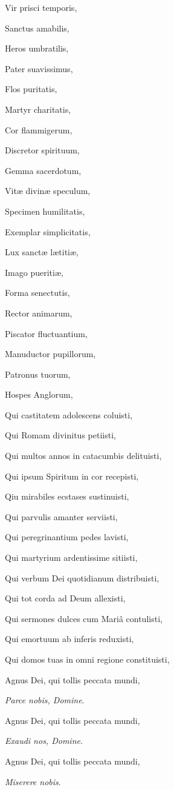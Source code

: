 Vir prisci temporis,

Sanctus amabilis,

Heros umbratilis,

Pater suavissimus,

Flos puritatis,

Martyr charitatis,

Cor flammigerum, 

Discretor spirituum,

Gemma sacerdotum,

Vitæ divinæ speculum,

Specimen humilitatis,

Exemplar simplicitatis,

Lux sanctæ lætitiæ,

Imago pueritiæ,

Forma senectutis,

Rector animarum,

Piscator fluctuantium,

Manuductor pupillorum,

Patronus tuorum,

Hospes Anglorum,

Qui castitatem adolescens coluisti,

Qui Romam divinitus petiisti,

Qui multos annos in catacumbis delituisti,

Qui ipsum Spiritum in cor recepisti,

Qiu mirabiles ecstases sustinuisti,

Qui parvulis amanter serviisti,

Qui peregrinantium pedes lavisti,

Qui martyrium ardentissime sitiisti,

Qui verbum Dei quotidianum distribuisti,

Qui tot corda ad Deum allexisti,

Qui sermones dulces cum Mariâ contulisti,

Qui emortuum ab inferis reduxisti,

Qui domos tuas in omni regione constituisti,

Agnus Dei, qui tollis peccata mundi,

\emph{Parce nobis, Domine}.

Agnus Dei, qui tollis peccata mundi,

\emph{Exaudi nos, Domine}.

Agnus Dei, qui tollis peccata mundi,

\emph{Miserere nobis}.

